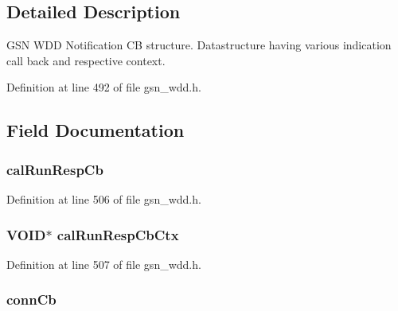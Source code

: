 \subsection{Detailed Description}
GSN WDD Notification CB structure. Datastructure having various indication call back and respective context. 

Definition at line 492 of file gsn\_\-wdd.h.



\subsection{Field Documentation}
\hypertarget{a00281_a80e4b422f7afe0e928eae23b721fe350}{
\subsubsection[{calRunRespCb}]{ {\bf calRunRespCb}}}
\label{a00281_a80e4b422f7afe0e928eae23b721fe350}


Definition at line 506 of file gsn\_\-wdd.h.

\hypertarget{a00281_a51b4af5a179eabffbb8fa7f53ac7c0a3}{
\subsubsection[{calRunRespCbCtx}]{\setlength{\rightskip}{0pt plus 5cm}VOID$\ast$ {\bf calRunRespCbCtx}}}
\label{a00281_a51b4af5a179eabffbb8fa7f53ac7c0a3}


Definition at line 507 of file gsn\_\-wdd.h.

\hypertarget{a00281_ac467196a531ed5b5891d047f599c899f}{
\subsubsection[{connCb}]{ {\bf connCb}}}
\label{a00281_ac467196a531ed5b5891d047f599c899f}


